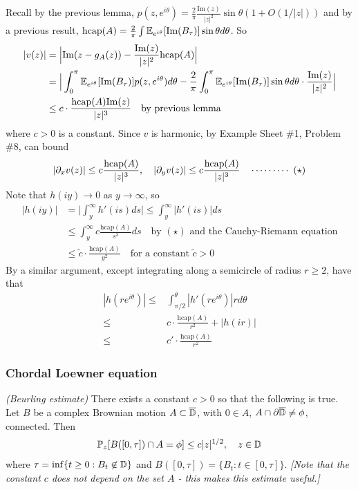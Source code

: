 \documentclass[12pt,a4paper]{article}
\newenvironment{proof}
{\begin{changemargin}{0.5cm}{0.5cm} 
	}%
	{\end{changemargin}
}
\newenvironment{p}
{\begin{proof} 
	}%
	{\end{proof}
}
\begin{document}
\begin{p}
Recall by the previous lemma, $p(z, e^{i\theta}) = \frac{2}{\pi} \frac{\text{Im}(z)}{|z|^2} \sin \theta (1+ O(1/|z|))$ and  by a previous result, $\text{hcap}(A) = \frac{2}{\pi} \int \mathbb{E}_{e^{i\theta}}[\text{Im}(B_{\tau})] \sin \theta d\theta$. So
\begin{align*}
|v(z)| &= \Big|\text{Im}(z- g_A(z)) - \frac{\text{Im}(z)}{|z|^2} \text{hcap}(A)\Big| \\
&= \Big|\int_0^{\pi} \mathbb{E}_{e^{i\theta}} [\text{Im}(B_{\tau})] p(z, e^{i\theta}) d\theta - \frac{2}{\pi}\int_0^{\pi} \mathbb{E}_{e^{i\theta}}[\text{Im}(B_{\tau})] \sin \theta d\theta \cdot \frac{\text{Im}(z)}{|z|^2}\Big| \\
&\leq c\cdot \frac{\text{hcap}(A)\text{Im}(z)}{|z|^3} \quad \text{by previous lemma}
\end{align*}
where $c>0$ is a constant. Since $v$ is harmonic, by Example Sheet \#1, Problem \#8, can bound
\begin{align*}
|\partial_x v(z)| \leq c\frac{\text{hcap}(A)}{|z|^3}, \quad |\partial_y v(z)| \leq c\frac{\text{hcap}(A)}{|z|^3} \quad \cdots\cdots\cdots\,\,(\star)
\end{align*}
Note that $h(iy) \rightarrow 0$ as $y\rightarrow \infty$, so 
\begin{align*}
|h(iy)| &= \big| \int_y^{\infty} h'(is)ds  \big| \leq \int_y^{\infty} |h'(is)|ds \\
&\leq \int_y^{\infty} c \frac{\text{hcap}(A)}{s^3} ds \quad \text{by } (\star) \text{ and the Cauchy-Riemann equation} \\
&\leq \tilde{c} \cdot \frac{\text{hcap}(A)}{y^2} \quad \text{for a constant } \tilde{c} >0
\end{align*}
\quad By a similar argument, except integrating along a semicircle of radius $r\geq 2$, have that
\begin{align*}
|h(re^{i\theta})| \leq & \int_{\pi/2}^{\theta} |h'(re^{i\theta})| rd\theta \\
\leq & c \cdot \frac{\text{hcap}(A)}{r^2} + |h(ir)| \\
\leq & c' \cdot \frac{\text{hcap}(A)}{r^2}
\end{align*}

\eop
\end{p}
\s

\subsubsection*{Chordal Loewner equation}

\thm \emph{(Beurling estimate)} There exists a constant $c>0$ so that the following is true. Let $B$ be a complex Brownian motion $A\subset \overline{\mathbb{D}}$, with $0\in A$, $A\cap \partial \overline{\mathbb{D}} \neq \phi$, connected. Then
\begin{align*}
\mathbb{P}_z [ B([0, \tau]) \cap A = \phi] \leq c|z|^{1/2}, \quad z\in \mathbb{D} 
\end{align*}
where $\tau =\inf \{t\geq 0 : B_t \not\in \mathbb{D} \}$ and $B([0, \tau]) = \{B_t : t\in [0, \tau] \}$. \emph{[Note that the constant $c$ does not depend on the set $A$ - this makes this estimate useful.]}
\end{document}
